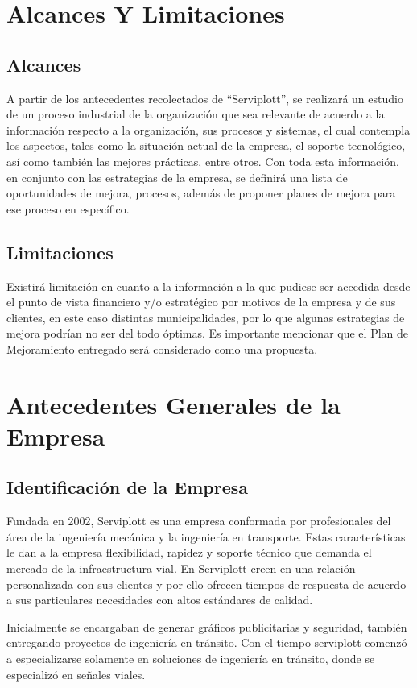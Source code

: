 \section{Alcances Y Limitaciones}
	\subsection{Alcances}
	A partir de los antecedentes recolectados de “Serviplott”, se realizará un estudio de un proceso industrial de la organización que sea relevante de acuerdo a la información respecto a la organización,  sus procesos y sistemas, el cual contempla los aspectos, tales como la situación actual de la empresa, el soporte tecnológico, así como también las mejores prácticas, entre otros. Con toda esta información, en conjunto con las estrategias de la empresa, se definirá una lista de oportunidades de mejora, procesos, además de proponer planes de mejora para ese proceso en específico. 
	
	\subsection{Limitaciones}
	Existirá limitación en cuanto a la información a la que pudiese ser accedida desde el punto de vista financiero y/o estratégico por motivos de la empresa y de sus clientes, en este caso distintas municipalidades, por lo que algunas estrategias de mejora podrían no ser del todo óptimas. Es importante mencionar que el Plan de Mejoramiento entregado será considerado como una propuesta.
\newpage
\section{Antecedentes Generales de la Empresa}
	\subsection{Identificación de la Empresa}
	Fundada en 2002, Serviplott es una empresa conformada por profesionales del área de la ingeniería mecánica y la ingeniería en transporte. Estas características le dan a la empresa flexibilidad, rapidez y soporte técnico que demanda el mercado de la infraestructura vial. En Serviplott creen en una relación personalizada con sus clientes y por ello ofrecen tiempos de respuesta de acuerdo a sus particulares necesidades con altos estándares de calidad.
\vspace{5mm}

Inicialmente se encargaban de generar gráficos publicitarias y seguridad, también entregando proyectos de ingeniería en tránsito. Con el tiempo serviplott comenzó a especializarse solamente en soluciones de ingeniería en tránsito, donde se especializó en señales viales.\vspace{5mm}

